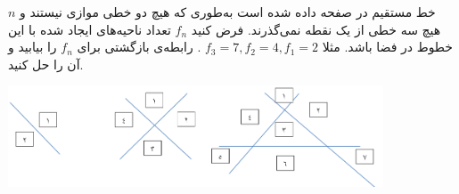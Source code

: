     \p 
$n$
خط مستقیم در صفحه داده شده است به‌طوری که هیچ دو خطی موازی نیستند و هیچ سه خطی از یک نقطه نمی‌گذرند. فرض کنید
$f_n$
تعداد ناحیه‌های ایجاد شده با این خطوط در فضا باشد. مثلا
$f_3 = 7, f_2 = 4, f_1 = 2$
. رابطه‌ی بازگشتی برای
$f_n$
را بیابید و آن را حل کنید.
\begin{center}
\includegraphics[height=3cm]{1.png}
\end{center}